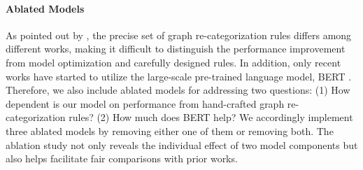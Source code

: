 \documentclass[11pt,a4paper]{article}
\begin{document}
	\paragraph{Ablated Models}
	As pointed out by , the precise set of graph re-categorization rules differs among different works, making it difficult to distinguish the performance improvement from model optimization and carefully designed rules. In addition, only recent works \cite{zhang-etal-2019-amr,zhang-etal-2019-broad,lindemann-etal-2019-compositional,naseem-etal-2019-rewarding} have started to utilize the large-scale pre-trained language model, BERT \cite{devlin-etal-2019-bert,Wolf2019HuggingFacesTS}. Therefore, we also include ablated models for addressing two questions: (1) How dependent is our model on performance from hand-crafted graph re-categorization rules? (2) How much does BERT help? We accordingly implement three ablated models by removing either one of them or removing both. The ablation study not only reveals the individual effect of two model components but also helps facilitate fair comparisons with prior works.
\end{document}
